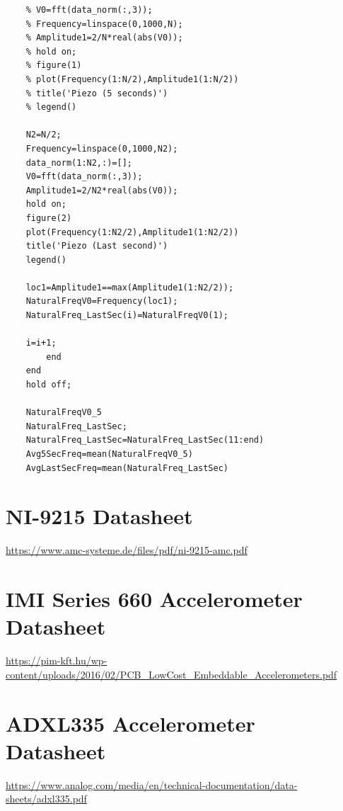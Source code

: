 \documentclass{article}
\begin{document}
\begin{appendices}
\begin{verbatim}
    % V0=fft(data_norm(:,3));
    % Frequency=linspace(0,1000,N);
    % Amplitude1=2/N*real(abs(V0));
    % hold on;
    % figure(1)
    % plot(Frequency(1:N/2),Amplitude1(1:N/2))
    % title('Piezo (5 seconds)')
    % legend()

    N2=N/2;
    Frequency=linspace(0,1000,N2);
    data_norm(1:N2,:)=[];
    V0=fft(data_norm(:,3));
    Amplitude1=2/N2*real(abs(V0));
    hold on;
    figure(2)
    plot(Frequency(1:N2/2),Amplitude1(1:N2/2))
    title('Piezo (Last second)')
    legend()

    loc1=Amplitude1==max(Amplitude1(1:N2/2));
    NaturalFreqV0=Frequency(loc1);
    NaturalFreq_LastSec(i)=NaturalFreqV0(1);

    i=i+1;
        end
    end
    hold off;

    NaturalFreqV0_5
    NaturalFreq_LastSec;
    NaturalFreq_LastSec=NaturalFreq_LastSec(11:end)
    Avg5SecFreq=mean(NaturalFreqV0_5)
    AvgLastSecFreq=mean(NaturalFreq_LastSec)

\end{verbatim}

\section*{NI-9215 Datasheet}
\url{https://www.amc-systeme.de/files/pdf/ni-9215-amc.pdf}

\section*{IMI Series 660 Accelerometer Datasheet}
\url{https://pim-kft.hu/wp-content/uploads/2016/02/PCB_LowCost_Embeddable_Accelerometers.pdf}

\section*{ADXL335 Accelerometer Datasheet}
\url{https://www.analog.com/media/en/technical-documentation/data-sheets/adxl335.pdf}

\end{appendices}
\end{document}
